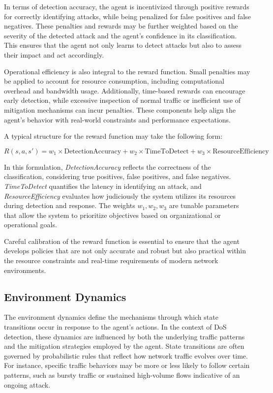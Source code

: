 \documentclass[16pt]{report}
\begin{document}
In terms of detection accuracy, the agent is incentivized through positive rewards for correctly identifying attacks, while being penalized for false positives and false negatives. These penalties and rewards may be further weighted based on the severity of the detected attack and the agent’s confidence in its classification. This ensures that the agent not only learns to detect attacks but also to assess their impact and act accordingly.

Operational efficiency is also integral to the reward function. Small penalties may be applied to account for resource consumption, including computational overhead and bandwidth usage. Additionally, time-based rewards can encourage early detection, while excessive inspection of normal traffic or inefficient use of mitigation mechanisms can incur penalties. These components help align the agent’s behavior with real-world constraints and performance expectations.

A typical structure for the reward function may take the following form:

\begin{equation}
R(s, a, s') = w_{1} \times \text{DetectionAccuracy} + w_{2} \times \text{TimeToDetect} + w_{3} \times \text{ResourceEfficiency}
\end{equation}

In this formulation, \textit{DetectionAccuracy} reflects the correctness of the classification, considering true positives, false positives, and false negatives. \textit{TimeToDetect} quantifies the latency in identifying an attack, and \textit{ResourceEfficiency} evaluates how judiciously the system utilizes its resources during detection and response. The weights \(w_{1}, w_{2}, w_{3}\) are tunable parameters that allow the system to prioritize objectives based on organizational or operational goals.

Careful calibration of the reward function is essential to ensure that the agent develops policies that are not only accurate and robust but also practical within the resource constraints and real-time requirements of modern network environments.


\subsection{Environment Dynamics}

The environment dynamics define the mechanisms through which state transitions occur in response to the agent’s actions. In the context of DoS detection, these dynamics are influenced by both the underlying traffic patterns and the mitigation strategies employed by the agent. State transitions are often governed by probabilistic rules that reflect how network traffic evolves over time. For instance, specific traffic behaviors may be more or less likely to follow certain patterns, such as bursty traffic or sustained high-volume flows indicative of an ongoing attack.
\end{document}
